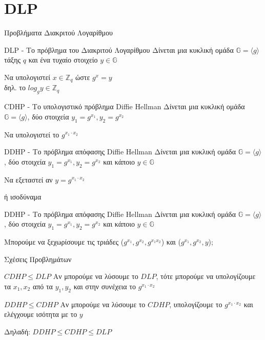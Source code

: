 \documentclass[handout]{beamer}
\begin{document}
\section{DLP}
\begin{frame}[allowframebreaks]{Προβλήματα Διακριτού Λογαρίθμου}

\begin{block}{DLP - Το πρόβλημα του Διακριτού Λογαρίθμου}
Δίνεται μια κυκλική ομάδα $\mathbb{G}=\langle g \rangle$ τάξης $q$ και ένα τυχαίο στοιχείο $y \in \mathbb{G}$

Να υπολογιστεί $x \in \mathbb{Z}_q$ ώστε $g^x = y$ \\
δηλ. το $log_g y \in \mathbb{Z}_q$
\end{block}

\begin{block}{CDHP - Το υπολογιστικό πρόβλημα Diffie Hellman}
Δίνεται μια κυκλική ομάδα $\mathbb{G}=\langle g \rangle$, δύο στοιχεία $y_1=g^{x_1}, y_2 = g^{x_2}$

Να υπολογιστεί το $g^{x_1 \cdot x_2}$ 
\end{block}


\framebreak

\begin{block}{DDHP - Το πρόβλημα απόφασης Diffie Hellman}
Δίνεται μια κυκλική  ομάδα $\mathbb{G}=\langle g \rangle$, δύο στοιχεία $y_1=g^{x_1}, y_2 = g^{x_2}$ και κάποιο  $y \in \mathbb{G}$ 

Να εξεταστεί αν  $y = g^{x_1 \cdot x_2}$ 
\end{block}
ή ισοδύναμα
\begin{block}{DDHP - Το πρόβλημα απόφασης Diffie Hellman}
Δίνεται μια κυκλική  ομάδα $\mathbb{G}=\langle g \rangle$, δύο στοιχεία $y_1=g^{x_1}, y_2 = g^{x_2}$ και κάποιο  $y \in \mathbb{G}$ 

Μπορούμε να ξεχωρίσουμε τις τριάδες ($g^{x_1}, g^{x_2}, g^{x_1x_2}$) και  ($g^{x_1}, g^{x_2}, y$);
\end{block}
\end{frame}

\begin{frame}{Σχέσεις Προβλημάτων}
\begin{block}{$CDHP \leq DLP$}
Αν μπορούμε να λύσουμε το $DLP$, τότε μπορούμε να υπολογίζουμε τα $x_1, x_2$ από τα $y_1, y_2$ και στην συνέχεια το $g^{x_1 \cdot x_2}$
\end{block}

\pause
 
\begin{block}{$DDHP \leq CDHP$}
Αν μπορούμε να λύσουμε το $CDHP$, υπολογίζουμε το $g^{x_1 \cdot x_2}$ και ελέγχουμε ισότητα με το $y$
\end{block}
 
\pause 
Δηλαδή: $DDHP \leq CDHP \leq DLP$
\end{frame}
 
\end{document}
